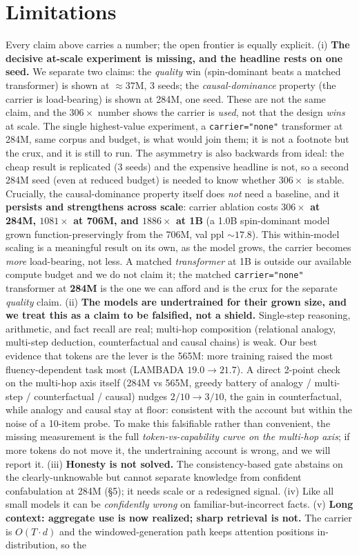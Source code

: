 \documentclass[11pt]{article}
\newcommand{\code}[1]{\texttt{#1}}
\begin{document}
\section{Limitations}
Every claim above carries a number; the open frontier is equally explicit. (i) \textbf{The decisive at-scale experiment is missing, and the headline rests on one seed.} We separate two claims: the \emph{quality} win (spin-dominant beats a matched transformer) is shown at ${\approx}37$M, 3 seeds; the \emph{causal-dominance} property (the carrier is load-bearing) is shown at 284M, one seed. These are not the same claim, and the $306\times$ number shows the carrier is \emph{used}, not that the design \emph{wins} at scale. The single highest-value experiment, a \code{carrier="none"} transformer at 284M, same corpus and budget, is what would join them; it is not a footnote but the crux, and it is still to run. The asymmetry is also backwards from ideal: the cheap result is replicated (3 seeds) and the expensive headline is not, so a second 284M seed (even at reduced budget) is needed to know whether $306\times$ is stable. Crucially, the causal-dominance property itself does \emph{not} need a baseline, and it \textbf{persists and strengthens across scale}: carrier ablation costs \textbf{$306\times$ at 284M, $1081\times$ at 706M, and $1886\times$ at 1B} (a 1.0B spin-dominant model grown function-preservingly from the 706M, val ppl ${\sim}17.8$). This within-model scaling is a meaningful result on its own, as the model grows, the carrier becomes \emph{more} load-bearing, not less. A matched \emph{transformer} at 1B is outside our available compute budget and we do not claim it; the matched \code{carrier="none"} transformer at \textbf{284M} is the one we can afford and is the crux for the separate \emph{quality} claim. (ii) \textbf{The models are undertrained for their grown size, and we treat this as a claim to be falsified, not a shield.} Single-step reasoning, arithmetic, and fact recall are real; multi-hop composition (relational analogy, multi-step deduction, counterfactual and causal chains) is weak. Our best evidence that tokens are the lever is the 565M: more training raised the most fluency-dependent task most (LAMBADA $19.0\to21.7$). A direct 2-point check on the multi-hop axis itself (284M vs 565M, greedy battery of analogy / multi-step / counterfactual / causal) nudges $2/10 \to 3/10$, the gain in counterfactual, while analogy and causal stay at floor: consistent with the account but within the noise of a 10-item probe. To make this falsifiable rather than convenient, the missing measurement is the full \emph{token-vs-capability curve on the multi-hop axis}; if more tokens do not move it, the undertraining account is wrong, and we will report it. (iii) \textbf{Honesty is not solved.} The consistency-based gate abstains on the clearly-unknowable but cannot separate knowledge from confident confabulation at 284M (\S5); it needs scale or a redesigned signal. (iv) Like all small models it can be \emph{confidently wrong} on familiar-but-incorrect facts. (v) \textbf{Long context: aggregate use is now realized; sharp retrieval is not.} The carrier is $O(T\cdot d)$ and the windowed-generation path keeps attention positions in-distribution, so the 
\end{document}
